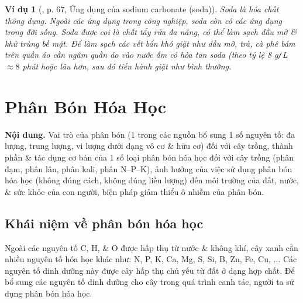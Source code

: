 \documentclass{article}
\newtheorem{vidu}{Ví dụ}
\begin{document}
\begin{vidu}[\cite{SGK_KHTN_8_Canh_Dieu},  p. 67, Ứng dụng của sodium carbonate (soda)]
	Soda là hóa chất thông dụng. Ngoài các ứng dụng trong công nghiệp, soda còn có các ứng dụng trong đời sống. Soda được coi là chất tẩy rửa đa năng, có thể làm sạch dầu mỡ \& khử trùng bề mặt. Để làm sạch các vết bẩn khó giặt như dầu mỡ, trà, cà phê bám trên quần áo cần ngâm quần áo vào nước ấm có hòa tan soda (theo tỷ lệ \emph{8 g\texttt{/}L} $\approx8$ phút hoặc lâu hơn, sau đó tiến hành giặt như bình thường.
\end{vidu}
\noindent{}


\section{Phân Bón Hóa Học}
\textsf{\textbf{Nội dung.} Vai trò của phân bón (1 trong các nguồn bổ sung 1 số nguyên tố: đa lượng, trung lượng, vi lượng dưới dạng vô cơ \& hữu cơ) đối với cây trồng, thành phần \& tác dụng cơ bản của 1 số loại phân bón hóa học đối với cây trồng (phân đạm, phân lân, phân kali, phân N--P--K), ảnh hưởng của việc sử dụng phân bón hóa học (không đúng cách, không đúng liều lượng) đến môi trường của đất, nước, \& sức khỏe của con người, biện pháp giảm thiểu ô nhiễm của phân bón.}

\subsection{Khái niệm về phân bón hóa học}
Ngoài các nguyên tố C, H, \& O được hấp thụ từ nước \& không khí, cây xanh cần nhiều nguyên tố hóa học khác như: N, P, K, Ca, Mg, S, Si, B, Zn, Fe, Cu, $\ldots$ Các nguyên tố dinh dưỡng này được cây hấp thụ chủ yếu từ đất ở dạng hợp chất. Để bổ sung các nguyên tố dinh dưỡng cho cây trong quá trình canh tác, người ta sử dụng phân bón hóa học.
\end{document}
